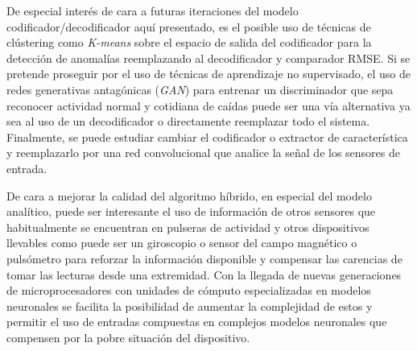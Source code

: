 De especial interés de cara a futuras iteraciones del modelo codificador/decodificador aquí presentado, es el posible uso de técnicas de clústering como \textit{K-means} sobre el espacio de salida del codificador para la detección de anomalías reemplazando al decodificador y comparador RMSE. Si se pretende proseguir por el uso de técnicas de aprendizaje no supervisado, el uso de redes generativas antagónicas (\textit{GAN}) para entrenar un discriminador que sepa reconocer actividad normal y cotidiana de caídas puede ser una vía alternativa ya sea al uso de un decodificador o directamente reemplazar todo el sistema. Finalmente, se puede estudiar cambiar el codificador o extractor de característica y reemplazarlo por una red convolucional que analice la señal de los sensores de entrada.

De cara a mejorar la calidad del algoritmo híbrido, en especial del modelo analítico, puede ser interesante el uso de información de otros sensores que habitualmente se encuentran en pulseras de actividad y otros dispositivos llevables como puede ser un giroscopio o sensor del campo magnético o pulsómetro para reforzar la información disponible y compensar las carencias de tomar las lecturas desde una extremidad. Con la llegada de nuevas generaciones de microprocesadores con unidades de cómputo especializadas en modelos neuronales se facilita la posibilidad de aumentar la complejidad de estos y permitir el uso de entradas compuestas en complejos modelos neuronales que compensen por la pobre situación del dispositivo.


